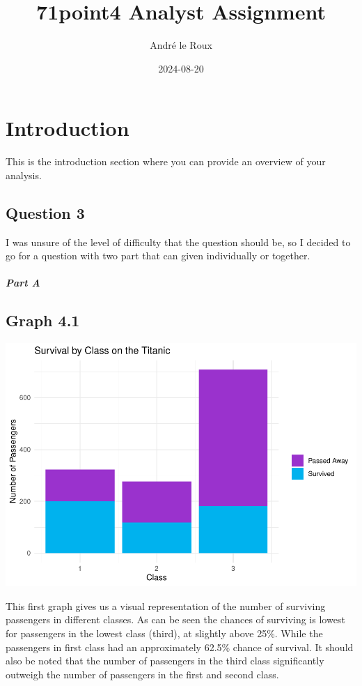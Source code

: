 \documentclass[
  11pt,
]{article}
\title{71point4 Analyst Assignment}
\author{André le Roux}
\date{2024-08-20}
\begin{document}
\maketitle

\hypertarget{introduction}{%
\section{Introduction}\label{introduction}}

This is the introduction section where you can provide an overview of
your analysis.

\hypertarget{question-3}{%
\subsection{Question 3}\label{question-3}}

I was unsure of the level of difficulty that the question should be, so
I decided to go for a question with two part that can given individually
or together.

\hypertarget{part-a}{%
\subparagraph{Part A}\label{part-a}}

\hypertarget{graph-4.1}{%
\subsection{Graph 4.1}\label{graph-4.1}}

\includegraphics{README_files/figure-latex/unnamed-chunk-2-1.pdf}

This first graph gives us a visual representation of the number of
surviving passengers in different classes. As can be seen the chances of
surviving is lowest for passengers in the lowest class (third), at
slightly above 25\%. While the passengers in first class had an
approximately 62.5\% chance of survival. It should also be noted that
the number of passengers in the third class significantly outweigh the
number of passengers in the first and second class.
\end{document}
